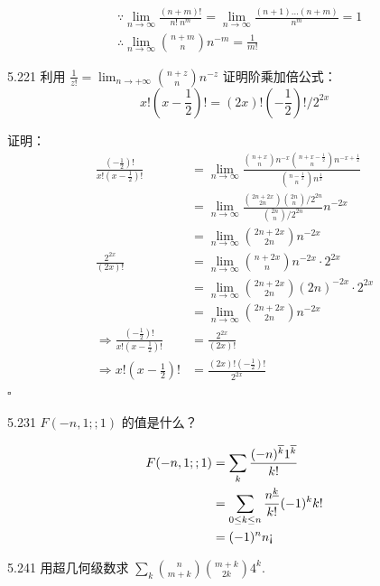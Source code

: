 \begin{align*}
  &\because \lim_{n \to \infty} \frac{(n+m)!}{n! \ n^m} = \lim_{n \to \infty} \frac{(n+1) \dots (n+m)}{n^m} = 1 \\
  &\therefore \lim_{n \to \infty} \binom{n+m}{n} n^{-m} = \frac{1}{m!}
\end{align*}

\begin{problem}{5.22}{1}
  利用 \( \frac{1}{z!} = \lim_{n \to + \infty} \binom{n+z}{n} n^{-z} \) 证明阶乘加倍公式：
  \[
    x! \left( x - \frac{1}{2} \right)! = (2x)! \left(- \frac{1}{2} \right)! / 2^{2x}
  \]
\end{problem}

证明：
\begin{align*}
  \frac{(-\frac{1}{2})!}{x! (x-\frac{1}{2})!} &= \lim_{n \to \infty} \frac{\binom{n+x}{n} n^{-x} \binom{n+x-\frac{1}{2}}{n} n^{-x+\frac{1}{2}}}{\binom{n-\frac{1}{2}}{n} n^{\frac{1}{2}}} \\
  &= \lim_{n \to \infty} \frac{\binom{2n+2x}{2n} \binom{2n}{n} / 2^{2n}}{\binom{2n}{n} / 2^{2n}} n^{-2x} \\
  &= \lim_{n \to \infty} \binom{2n+2x}{2n} n^{-2x} \\
  \frac{2^{2x}}{(2x)!} &= \lim_{n \to \infty} \binom{n+2x}{n} n^{-2x} \cdot 2^{2x} \\
  &= \lim_{n \to \infty} \binom{2n+2x}{2n} (2n)^{-2x} \cdot 2^{2x} \\
  &= \lim_{n \to \infty} \binom{2n+2x}{2n} n^{-2x} \\
  \Rightarrow
  \frac{(-\frac{1}{2})!}{x! (x-\frac{1}{2})!} &= \frac{2^{2x}}{(2x)!} \\
  \Rightarrow
  x! \left( x - \frac{1}{2} \right)! &= \frac{(2x)! \left(- \frac{1}{2} \right)!}{2^{2x}}
\end{align*}
\hfill \( \square \)

\begin{problem}{5.23}{1}
  \( F(-n,1;;1) \) 的值是什么？
\end{problem}

\begin{align*}
  F(-n,1;;1) &= \sum_k \frac{(-n)^{\overline{k}} 1^{\overline{k}}}{k!} \\
  &= \sum_{0 \le k \le n} \frac{n^{\underline{k}}}{k!} (-1)^k k! \\
  &= (-1)^n n \text{\textexclamdown}
\end{align*}

\begin{problem}{5.24}{1}
  用超几何级数求 \( \sum_k \binom{n}{m+k} \binom{m+k}{2k} 4^k \).
\end{problem}

